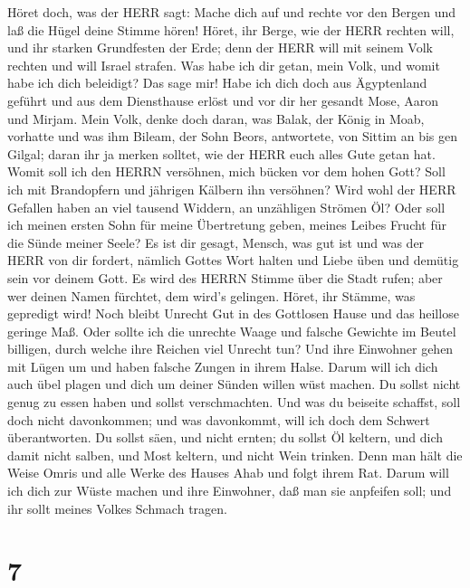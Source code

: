  Höret doch, was der HERR sagt: Mache dich auf und rechte
vor den Bergen und laß die Hügel deine Stimme hören!  Höret,
ihr Berge, wie der HERR rechten will, und ihr starken Grundfesten der
Erde; denn der HERR will mit seinem Volk rechten und will Israel
strafen.  Was habe ich dir getan, mein Volk, und womit habe
ich dich beleidigt? Das sage mir!  Habe ich dich doch aus
Ägyptenland geführt und aus dem Diensthause erlöst und vor dir her
gesandt Mose, Aaron und Mirjam.  Mein Volk, denke doch
daran, was Balak, der König in Moab, vorhatte und was ihm Bileam, der
Sohn Beors, antwortete, von Sittim an bis gen Gilgal; daran ihr ja
merken solltet, wie der HERR euch alles Gute getan hat. 
Womit soll ich den HERRN versöhnen, mich bücken vor dem hohen Gott? Soll
ich mit Brandopfern und jährigen Kälbern ihn versöhnen? 
Wird wohl der HERR Gefallen haben an viel tausend Widdern, an unzähligen
Strömen Öl? Oder soll ich meinen ersten Sohn für meine Übertretung
geben, meines Leibes Frucht für die Sünde meiner Seele?  Es
ist dir gesagt, Mensch, was gut ist und was der HERR von dir fordert,
nämlich Gottes Wort halten und Liebe üben und demütig sein vor deinem
Gott.  Es wird des HERRN Stimme über die Stadt rufen; aber
wer deinen Namen fürchtet, dem wird's gelingen. Höret, ihr Stämme, was
gepredigt wird!  Noch bleibt Unrecht Gut in des Gottlosen
Hause und das heillose geringe Maß.  Oder sollte ich die
unrechte Waage und falsche Gewichte im Beutel billigen, 
durch welche ihre Reichen viel Unrecht tun? Und ihre Einwohner gehen mit
Lügen um und haben falsche Zungen in ihrem Halse.  Darum
will ich dich auch übel plagen und dich um deiner Sünden willen wüst
machen.  Du sollst nicht genug zu essen haben und sollst
verschmachten. Und was du beiseite schaffst, soll doch nicht
davonkommen; und was davonkommt, will ich doch dem Schwert
überantworten.  Du sollst säen, und nicht ernten; du sollst
Öl keltern, und dich damit nicht salben, und Most keltern, und nicht
Wein trinken.  Denn man hält die Weise Omris und alle Werke
des Hauses Ahab und folgt ihrem Rat. Darum will ich dich zur Wüste
machen und ihre Einwohner, daß man sie anpfeifen soll; und ihr sollt
meines Volkes Schmach tragen.

\hypertarget{section-6}{%
\section{7}\label{section-6}}

